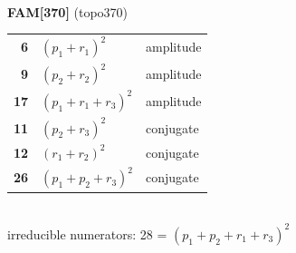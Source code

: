 \documentclass[10pt]{article}
\begin{document}
\begin{minipage}[t]{0.48\textwidth}
{}\\[2mm]\textbf{FAM[370]} (topo370)\\[2pt]{\footnotesize\begin{tabular}{@{}r@{\ \ }l@{\ \ }l@{}}\textbf{6} & $(p_1+r_1)^2$ & amplitude\\
\textbf{9} & $(p_2+r_2)^2$ & amplitude\\
\textbf{17} & $(p_1+r_1+r_3)^2$ & amplitude\\
\textbf{11} & $(p_2+r_3)^2$ & conjugate\\
\textbf{12} & $(r_1+r_2)^2$ & conjugate\\
\textbf{26} & $(p_1+p_2+r_3)^2$ & conjugate\\\end{tabular}}\\[2pt]{\scriptsize irreducible numerators: 28 = $(p_1+p_2+r_1+r_3)^2$}\end{minipage}

\bigskip
\end{document}

